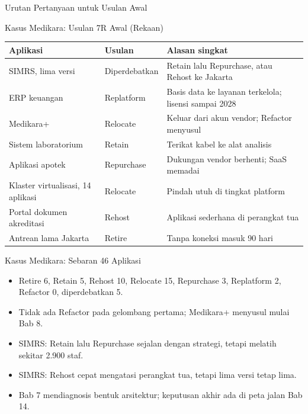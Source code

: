 \documentclass[aspectratio=169, table, 12pt]{beamer}
\begin{document}
\begin{frame}{Urutan Pertanyaan untuk Usulan Awal}
  \centering
\end{frame}

\begin{frame}{Kasus Medikara: Usulan 7R Awal (Rekaan)}
  \scriptsize
  \begin{tabularx}{\textwidth}{>{\raggedright\arraybackslash}p{3.6cm}
      >{\raggedright\arraybackslash}p{2.2cm}Y}
    \hline
    \textbf{Aplikasi} & \textbf{Usulan} & \textbf{Alasan singkat} \\
    \hline
    SIMRS, lima versi & Diperdebatkan & Retain lalu Repurchase, atau Rehost ke Jakarta \\
    \hline
    ERP keuangan & Replatform & Basis data ke layanan terkelola; lisensi sampai 2028 \\
    \hline
    Medikara+ & Relocate & Keluar dari akun vendor; Refactor menyusul \\
    \hline
    Sistem laboratorium & Retain & Terikat kabel ke alat analisis \\
    \hline
    Aplikasi apotek & Repurchase & Dukungan vendor berhenti; SaaS memadai \\
    \hline
    Klaster virtualisasi, 14 aplikasi & Relocate & Pindah utuh di tingkat platform \\
    \hline
    Portal dokumen akreditasi & Rehost & Aplikasi sederhana di perangkat tua \\
    \hline
    Antrean lama Jakarta & Retire & Tanpa koneksi masuk 90 hari \\
    \hline
  \end{tabularx}
\end{frame}

\begin{frame}{Kasus Medikara: Sebaran 46 Aplikasi}
  \begin{itemize}
    \item Retire 6, Retain 5, Rehost 10, Relocate 15, Repurchase 3, Replatform 2,
          Refactor 0, diperdebatkan 5.
    \item Tidak ada Refactor pada gelombang pertama; Medikara+ menyusul mulai Bab 8.
    \item SIMRS: Retain lalu Repurchase sejalan dengan strategi, tetapi melatih sekitar
          2.900 staf.
    \item SIMRS: Rehost cepat mengatasi perangkat tua, tetapi lima versi tetap lima.
    \item Bab 7 mendiagnosis bentuk arsitektur; keputusan akhir ada di peta jalan Bab 14.
  \end{itemize}
\end{frame}
\end{document}
